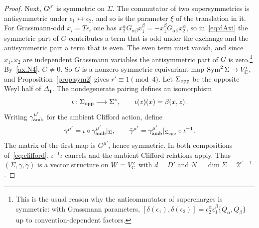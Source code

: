 \begin{proof}
Next, $G^{\mu'}$ is symmetric on $\Sigma$. The commutator of two supersymmetries is antisymmetric under $\epsilon_1\leftrightarrow\epsilon_2$, and so is the parameter $\xi$ of the translation in it. For Grassmann-odd $x_i=T\epsilon_i$ one has $x_2^\alpha G_{\alpha\beta}x_1^\beta=-x_1^\beta G_{\alpha\beta}x_2^\alpha$, so in~\eqref{eq:dAxi} the symmetric part of $G$ contributes a term that is odd under the exchange and the antisymmetric part a term that is even. The even term must vanish, and since $x_1,x_2$ are independent Grassmann variables the antisymmetric part of $G$ is zero.\footnote{This is the usual reason why the anticommutator of supercharges is symmetric: with Grassmann parameters, $[\delta(\epsilon_1),\delta(\epsilon_2)]=\epsilon_2^\alpha\epsilon_1^\beta\{Q_\alpha,Q_\beta\}$ up to convention-dependent factors.} By~\ref{ax:N4}, $G\ne0$. So $G$ is a nonzero symmetric equivariant map $\operatorname{Sym}^2\Sigma\to V'_{\mathbb{C}}$, and Proposition~\ref{prop:sym2} gives $r'\equiv1\pmod 4$. Let $\Sigma_{\rm opp}$ be the opposite Weyl half of $\Delta_{\mathbf 1}$. The nondegenerate pairing defines an isomorphism
\[
 \iota:\Sigma_{\rm opp}\longrightarrow\Sigma^*,\qquad
 \iota(z)(x)=\beta(x,z).
\]
Writing $\gamma_{\rm amb}^{\mu'}$ for the ambient Clifford action, define
\[
 \gamma^{\mu'}=\iota\circ\gamma_{\rm amb}^{\mu'}|_\Sigma,
 \qquad
 \tilde\gamma^{\mu'}=\gamma_{\rm amb}^{\mu'}|_{\Sigma_{\rm opp}}\circ\iota^{-1}.
\]
The matrix of the first map is $G^{\mu'}$, hence symmetric. In both compositions of~\eqref{eq:clifford}, $\iota^{-1}\iota$ cancels and the ambient Clifford relations apply. Thus $(\Sigma,\gamma,\tilde\gamma)$ is a vector structure on $W=V'_{\mathbb{C}}$ with $d=D'$ and $N=\dim\Sigma=2^{r'-1}$.


\end{proof}
